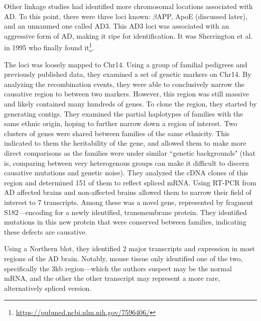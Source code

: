 Other linkage studies had identified more chromosomal locations associated with AD. To this point, there were three loci known: $\beta$APP, ApoE (discussed later), and an unnanmed one called AD3. This AD3 loci was associated with an aggressive form of AD, making it ripe for identification. It was Sherrington et al. in 1995 who finally found it\footnote{\url{https://pubmed.ncbi.nlm.nih.gov/7596406/}}.\newline

The loci was loosely mapped to Chr14. Using a group of familial pedigrees and previously published data, they examined a set of genetic markers on Chr14. By analyzing the recombination events, they were able to conclusively narrow the causative region to between two markers. However, this region was still massive and likely contained many hundreds of genes. To clone the region, they started by generating contigs. They examined the partial haplotypes of families with the same ethnic origin, hoping to further narrow down a region of interest. Two clusters of genes were shared between families of the same ethnicity. This indicated to them the heritability of the gene, and allowed them to make more direct comparisons as the families were under similar ``genetic backgrounds" (that is, comparing between very heterogenous groups can make it difficult to discern causative mutations and genetic noise). They analyzed the cDNA clones of this region and determined 151 of them to reflect spliced mRNA. Using RT-PCR from AD affected brains and non-affected brains allowed them to narrow their field of interest to 7 transcripts. Among these was a novel gene, represented by fragment S182---encoding for a newly identified, transmembrane protein. They identified mutations in this new protein that were conserved between families, indicating these defects are causative.\newline 


Using a Northern blot, they identified 2 major transcripts and expression in most regions of the AD brain. Notably, mouse tissue only identified one of the two, specifically the 3kb region---which the authors suspect may be the normal mRNA, and the other the other transcript may represent a more rare, alternatively spliced version. \newline

